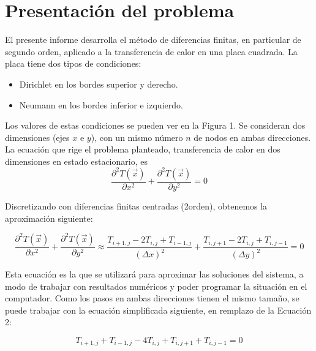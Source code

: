 \documentclass[12pt, notitlepage]{article}
\begin{document}
\section{Presentación del problema}
El presente informe desarrolla el método de diferencias finitas, en particular de segundo orden, aplicado a la transferencia de calor en una placa cuadrada. La placa tiene dos tipos de condiciones:
\begin{itemize}
\item{Dirichlet en los bordes superior y derecho.}
\item{Neumann en los bordes inferior e izquierdo.}
\end{itemize}

Los valores de estas condiciones se pueden ver en la Figura 1. Se consideran dos dimensiones (ejes $x$ e $y$), con un mismo número $n$ de nodos en ambas direcciones. La ecuación que rige el problema planteado, transferencia de calor en dos dimensiones en estado estacionario, es
\begin{equation}
\frac{\partial^2T(\vec{x})}{\partial x^2} + \frac{\partial^2T(\vec{x})}{\partial y^2} = 0
\end{equation}

Discretizando con diferencias finitas centradas (2\degree orden), obtenemos la aproximación siguiente:

\begin{equation}
\frac{\partial^2T(\vec{x})}{\partial x^2} + \frac{\partial^2T(\vec{x})}{\partial y^2} \approx \frac{T_{i+1,j} - 2T_{i,j} + T_{i-1,j}}{(\Delta x)^2} + \frac{T_{i,j+1} - 2T_{i,j} + T_{i,j-1}}{(\Delta y)^2} = 0
\end{equation}

Esta ecuación es la que se utilizará para aproximar las soluciones del sistema, a modo de trabajar con resultados numéricos y poder programar la situación en el computador. Como los pasos en ambas direcciones tienen el mismo tamaño, se puede trabajar con la ecuación simplificada siguiente, en remplazo de la Ecuación 2:

\begin{equation}
T_{i+1,j} + T_{i-1,j} - 4T_{i,j} + T_{i,j+1} + T_{i,j-1} = 0
\end{equation}
\end{document}
